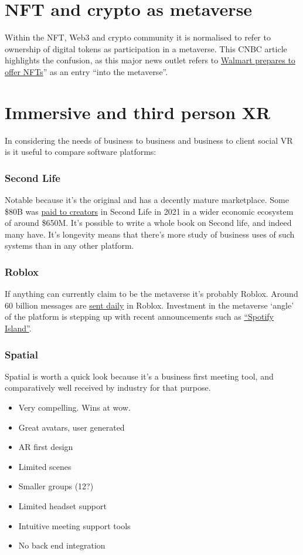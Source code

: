 \section{NFT and crypto as metaverse}
Within the NFT, Web3 and crypto community it is normalised to refer to ownership of digital tokens as participation in a metaverse. 
This CNBC article highlights the confusion, as this major news outlet refers to \href{https://www.cnbc.com/2022/01/16/walmart-is-quietly-preparing-to-enter-the-metaverse.html}{Walmart prepares to offer NFTs}'' as an entry ``into the metaverse''.
\section{Immersive and third person XR}
In considering the needs of business to business and business to client social VR is it useful to compare software platforms:
\subsubsection{Second Life}
Notable because it's the original and has a decently mature marketplace. Some \$80B was \href{https://www.zdnet.com/article/high-fidelity-invests-in-second-life-to-expand-virtual-world/}{paid to creators} in Second Life in 2021 in a wider economic ecosystem of around \$650M. It's possible to write a whole book on Second life, and indeed many have. It's longevity means that there's more study of business uses of such systems than in any other platform. 
\subsubsection{Roblox}
If anything can currently claim to be the metaverse it's probably Roblox. Around 60 billion messages are \href{https://podcasts.apple.com/us/podcast/developments-investments-experiences-in-the-metaverse/id1593908027?i=1000540906629}{sent daily} in Roblox. Investment in the metaverse `angle' of the platform is stepping up with recent announcements such as \href{https://techcrunch.com/2022/05/03/spotify-becomes-first-music-streamer-to-launch-on-roblox/?}{``Spotify Island''}. 
\subsubsection{Spatial}
Spatial is worth a quick look because it's a business first meeting tool, and comparatively well received by industry for that purpose.
\begin{itemize}
\item Very compelling. Wins at wow.
\item Great avatars, user generated
\item AR first design
\item Limited scenes
\item Smaller groups (12?)
\item Limited headset support
\item Intuitive meeting support tools
\item No back end integration
\end{itemize}
